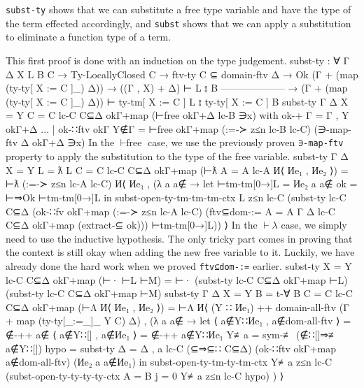 \documentclass[logo,bsc,singlespacing,parskip,online]{infthesis}
\renewenvironment{code}{\mintedcopy[breaklines,breaksymbolleft=\;]{agda}}{\endmintedcopy}
\begin{document}
\texttt{subst-ty} shows that we can substitute a free type variable and have the type of the term
effected accordingly, and \texttt{subst} shows that we can apply a substitution to eliminate a
function type of a term.

This first proof is done with an induction on the type judgement.
\begin{code}
  subst-ty : ∀ {Γ Δ X L B C}
    → Ty-LocallyClosed C
    → ftv-ty C ⊆ domain-ftv Δ
    → Ok (Γ + (map (ty-ty[ X := C ]_) Δ))
    → ((Γ , X) + Δ) ⊢ L ⦂ B
      --------------------
    → (Γ + (map (ty-ty[ X := C ]_) Δ)) ⊢ ty-tm[ X := C ] L ⦂ ty-ty[ X := C ] B
  subst-ty {Γ} {Δ} {X = Y} {C = C} lc-C C⊆Δ okΓ+map (⊢free okΓ+Δ lc-B ∋x)
    with ok-+ {Γ = Γ , Y} okΓ+Δ
  ... | ok-∷ftv okΓ Y∉Γ = ⊢free okΓ+map (:=-≻ z≤n lc-B lc-C) (∋-map-ftv Δ okΓ+Δ ∋x)
\end{code}
In the $\vdash\text{free}$ case, we use the previously proven \texttt{∋-map-ftv} property to apply
the substitution to the type of the free variable.
\begin{code}
  subst-ty {Γ} {Δ} {X = Y} {L = ƛ L} {C = C} lc-C C⊆Δ okΓ+map (⊢ƛ {A = A} lc-A И⟨ Иe₁ , Иe₂ ⟩) =
    ⊢ƛ (:=-≻ z≤n lc-A lc-C) И⟨ Иe₁ , (λ a {a∉} →
      let ⊢tm-tm[0→]L = Иe₂ a {a∉}
          ok = ⊢⇒Ok ⊢tm-tm[0→]L
      in subst-open-ty-tm-tm-tm-ctx L z≤n lc-C
        (subst-ty lc-C C⊆Δ (ok-∷fv
            okΓ+map
            (:=-≻ z≤n lc-A lc-C)
            (ftv⊆dom-:= {A = A} Γ Δ lc-C C⊆Δ okΓ+map (extract-⊆ ok)))
          ⊢tm-tm[0→]L)) ⟩
\end{code}
In the $\vdash\lambda$ case, we simply need to use the inductive hypothesis. The only tricky part
comes in proving that the context is still okay when adding the new free variable to it. Luckily, we
have already done the hard work when we proved \texttt{ftv⊆dom-:=} earlier.
\begin{code}
  subst-ty {X = Y} lc-C C⊆Δ okΓ+map (⊢· ⊢L ⊢M) = ⊢· (subst-ty lc-C C⊆Δ okΓ+map ⊢L) (subst-ty lc-C C⊆Δ okΓ+map ⊢M)
  subst-ty {Γ} {Δ} {X = Y} {B = t-∀ B} {C = C} lc-C C⊆Δ okΓ+map (⊢Λ И⟨ Иe₁ , Иe₂ ⟩) =
    ⊢Λ И⟨ (Y ∷ Иe₁) ++ domain-all-ftv (Γ + map (ty-ty[_:=_]_ Y C) Δ) , (λ a {a∉} →
      let ⟨ a∉Y∷Иe₁ , a∉dom-all-ftv ⟩ = ∉-++ a∉
          ⟨ a∉Y∷[] , a∉Иe₁ ⟩ = ∉-++ a∉Y∷Иe₁
          Y≢a = sym-≢ (∉∷[]⇒≢ a∉Y∷[])
          hypo = subst-ty {Δ = Δ , a} lc-C (⊆⇒⊆∷ C⊆Δ)
              (ok-∷ftv okΓ+map a∉dom-all-ftv) (Иe₂ a {a∉Иe₁})
      in subst-open-ty-tm-ty-tm-ctx Y≢a z≤n lc-C
        (subst-open-ty-ty-ty-ty-ctx {A = B} {j = 0} Y≢a z≤n lc-C hypo) ) ⟩
\end{code}
\end{document}
